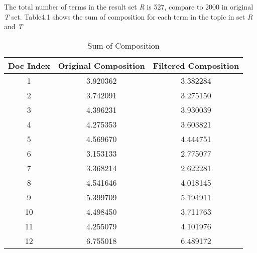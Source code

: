 \documentclass[11pt,twoside]{report}
\begin{document}
The total number of terms in the result set \textit{R} is 527, compare to 2000 in original \textit{T} set.
Table4.1 shows the sum of composition for each term in the topic in set  \textit{R} and \textit{T}
\begin{table}[ht]
\caption{Sum of Composition}
\centering
\begin{tabular}{c c c}
\hline\hline
Doc Index & Original Composition & Filtered Composition\\
\hline
1 & 3.920362 & 3.382284\\
2 & 3.742091 & 3.275150\\
3 & 4.396231 & 3.930039\\
4 & 4.275353 & 3.603821\\
5 & 4.569670 & 4.444751\\
6 & 3.153133 & 2.775077\\
7 & 3.368214 & 2.622281\\
8 & 4.541646 & 4.018145\\
9 & 5.399709 & 5.194911\\
10 & 4.498450 & 3.711763\\
11 & 4.255079 & 4.101976\\
12 & 6.755018 & 6.489172\\
\hline
\end{tabular}
\label{table:Topic Composition}
\end{table}

\end{document}

